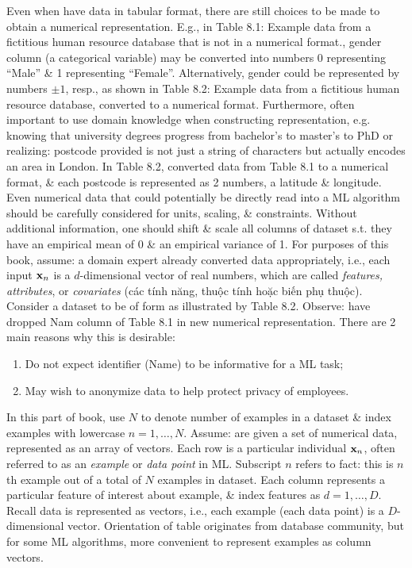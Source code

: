 \documentclass{article}
\begin{document}
\begin{itemize}
\begin{itemize}
\begin{itemize}
			Even when have data in tabular format, there are still choices to be made to obtain a numerical representation. E.g., in {\sf Table 8.1: Example data from a fictitious human resource database that is not in a numerical format.}, gender column (a categorical variable) may be converted into numbers 0 representing ``Male'' \& 1 representing ``Female''. Alternatively, gender could be represented by numbers $\pm1$, resp., as shown in {\sf Table 8.2: Example data from a fictitious human resource database, converted to a numerical format}. Furthermore, often important to use domain knowledge when constructing representation, e.g. knowing that university degrees progress from bachelor's to master's to PhD or realizing: postcode provided is not just a string of characters but actually encodes an area in London. In Table 8.2, converted data from Table 8.1 to a numerical format, \& each postcode is represented as 2 numbers, a latitude \& longitude. Even numerical data that could potentially be directly read into a ML algorithm should be carefully considered for units, scaling, \& constraints. Without additional information, one should shift \& scale all columns of dataset s.t. they have an empirical mean of 0 \& an empirical variance of 1. For purposes of this book, assume: a domain expert already converted data appropriately, i.e., each input ${\bf x}_n$ is a $d$-dimensional vector of real numbers, which are called {\it features, attributes}, or {\it covariates} (các tính năng, thuộc tính hoặc biến phụ thuộc). Consider a dataset to be of form as illustrated by Table 8.2. Observe: have dropped Nam column of Table 8.1 in new numerical representation. There are 2 main reasons why this is desirable:
			\begin{enumerate}
				\item Do not expect identifier (Name) to be informative for a ML task;
				\item May wish to anonymize data to help protect privacy of employees.
			\end{enumerate}
			In this part of book, use $N$ to denote number of examples in a dataset \& index examples with lowercase $n = 1,\ldots,N$. Assume: are given a set of numerical data, represented as an array of vectors. Each row is a particular individual ${\bf x}_n$, often referred to as an {\it example} or {\it data point} in ML. Subscript $n$ refers to fact: this is $n$th example out of a total of $N$ examples in dataset. Each column represents a particular feature of interest about example, \& index features as $d = 1,\ldots,D$. Recall data is represented as vectors, i.e., each example (each data point) is a $D$-dimensional vector. Orientation of table originates from database community, but for some ML algorithms, more convenient to represent examples as column vectors.
			

\end{itemize}
\end{itemize}
\end{itemize}
\end{document}

